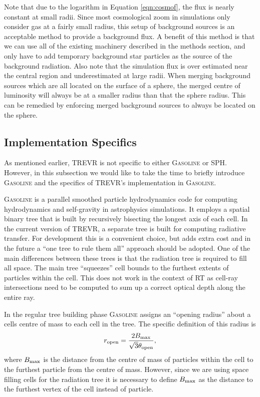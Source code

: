 \documentclass[fleq,usenatbib]{mnras}
\newcommand{\acro}{TREVR}
\newcommand{\tO}{\theta_{\rm open}}
\begin{document}
Note that due to the logarithm in Equation \ref{eqn:cosmof}, the flux is 
nearly constant at small radii. Since most cosmological zoom in simulations 
only consider gas at a fairly small radius, this setup of background sources 
is an acceptable method to provide a background flux. A benefit of this method 
is that we can use all of the existing machinery described in the methods 
section, and only have to add temporary background star particles as the 
source of the background radiation. Also note that the simulation flux is over 
estimated near the central region and underestimated at large radii. When 
merging background sources which are all located on the surface of a sphere, 
the merged centre of luminosity will always be at a smaller radius than that 
the sphere radius. This can be remedied by enforcing merged background sources 
to always be located on the sphere. 

\subsection{Implementation Specifics}\label{sec:specs}
As mentioned earlier, \acro{} is not specific to either \textsc{Gasoline} or 
SPH. However, in this subsection we would like to take the time to briefly  
introduce \textsc{Gasoline} and the specifics of \acro{}'s implementation in 
\textsc{Gasoline}.

\textsc{Gasoline} is a parallel smoothed particle hydrodynamics code for 
computing hydrodynamics and self-gravity in astrophysics simulations. It 
employs a spatial binary tree that is built by recursively bisecting the 
longest axis of each cell. In the current version of \acro{}, a separate tree 
is built for computing radiative transfer. For development this is a 
convenient choice, but adds extra cost and in the future a ``one tree to rule 
them all'' approach should be adopted. One of the main differences between 
these trees is that the radiation tree is required to fill all space. The main 
tree ``squeezes'' cell bounds to the furthest extents of particles within the 
cell. This does not work in the context of RT as cell-ray intersections need 
to be computed to sum up a correct optical depth along the entire ray.

In the regular tree building phase \textsc{Gasoline} assigns an ``opening 
radius'' about a cells centre of mass to each cell in the tree. The specific 
definition of this radius is 
\begin{equation}
r_{\rm open} = \frac{2 B_{\rm max}}{\sqrt{3} \tO},
\end{equation}
where $B_{\rm max}$ is the  distance from the centre of mass of particles 
within the cell to the furthest particle from the centre of mass. However, 
since we are using space filling cells for the radiation tree it is necessary 
to define $B_{\rm max}$ as the distance to the furthest vertex of the cell 
instead of particle.
\end{document}
